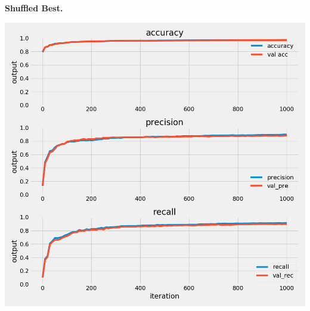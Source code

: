 \documentclass{article}
\begin{document}
\begin{multicols}{2}
	\begin{minipage}[t]{1\columnwidth}
	\begin{center}
	\textbf{Shuffled Best.}\par\medskip
	\includegraphics[width=0.9\columnwidth]{../images/best_with_threshold_class_4_cross_val_4.png}
	\label{shuffled}
	\end{center}
	\end{minipage}


\end{multicols}
\end{document}
